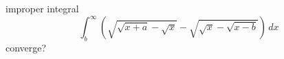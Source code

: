 improper integral
\[
\int_{b}^{\infty} \left( \sqrt{\sqrt{x+a}-\sqrt{x}} -
\sqrt{\sqrt{x}-\sqrt{x-b}} \right)\,dx
\]
converge?
